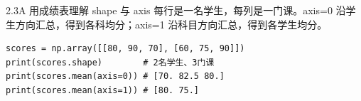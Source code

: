 \begin{frame}[fragile]{2.3A 用成绩表理解 shape 与 axis}
\small 每行是一名学生，每列是一门课。axis=0 沿学生方向汇总，得到各科均分；axis=1 沿科目方向汇总，得到各学生均分。
\medskip
\begin{lstlisting}
scores = np.array([[80, 90, 70], [60, 75, 90]])
print(scores.shape)        # 2名学生、3门课
print(scores.mean(axis=0)) # [70. 82.5 80.]
print(scores.mean(axis=1)) # [80. 75.]
\end{lstlisting}
\end{frame}
